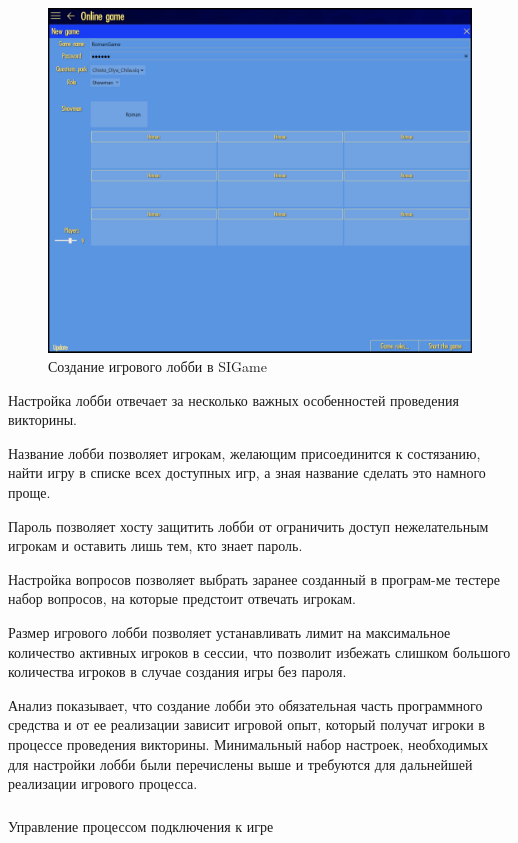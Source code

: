 \begin{figure}[!ht]
	\centering
	\includegraphics[scale=0.4]{attachments/sigame_host.png}  
	\caption{Создание игрового лобби в SIGame}
	\label{sec:analysis:analogues:host_game:sigame_host}
\end{figure}

Настройка лобби отвечает за несколько важных особенностей проведения викторины.

Название лобби позволяет игрокам, желающим присоединится к состязанию, найти игру в списке всех доступных игр, а зная название сделать это намного проще.

Пароль позволяет хосту защитить лобби от ограничить доступ нежелательным игрокам и оставить лишь тем, кто знает пароль.

Настройка вопросов позволяет выбрать заранее созданный в програм-ме тестере набор вопросов, на которые предстоит отвечать игрокам.

Размер игрового лобби позволяет устанавливать лимит на максимальное количество активных игроков в сессии, что позволит избежать слишком большого количества игроков в случае
создания игры без пароля.

Анализ показывает, что создание лобби это обязательная часть программного средства и от ее реализации зависит игровой опыт, который получат игроки в процессе проведения викторины.
Минимальный набор настроек, необходимых для настройки лобби были перечислены выше и требуются для дальнейшей реализации игрового процесса.

\subsubsection{} Управление процессом подключения к игре
\label{sec:analysis:analogues:join_game}

